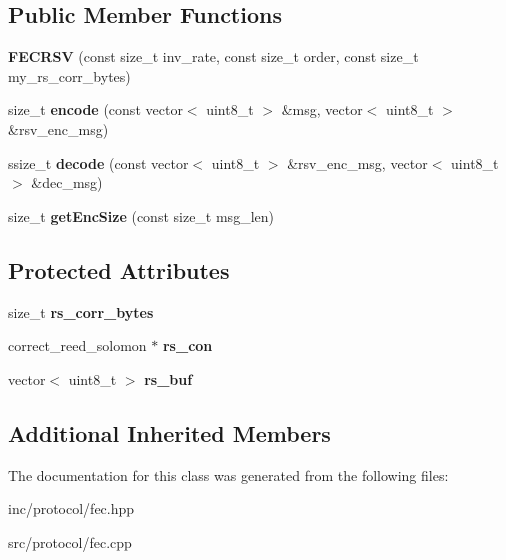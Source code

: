 \subsection*{Public Member Functions}
\begin{DoxyCompactItemize}
\item 
\mbox{\label{classFECRSV_ac7d8897c02cdb41a46d895b14bfb976f}} 
{\bfseries F\+E\+C\+R\+SV} (const size\+\_\+t inv\+\_\+rate, const size\+\_\+t order, const size\+\_\+t my\+\_\+rs\+\_\+corr\+\_\+bytes)
\item 
\mbox{\label{classFECRSV_ac9bd3fe4c494067e6f24a1287b0c562e}} 
size\+\_\+t {\bfseries encode} (const vector$<$ uint8\+\_\+t $>$ \&msg, vector$<$ uint8\+\_\+t $>$ \&rsv\+\_\+enc\+\_\+msg)
\item 
\mbox{\label{classFECRSV_a4781900bd59579d7a380687c59179ae5}} 
ssize\+\_\+t {\bfseries decode} (const vector$<$ uint8\+\_\+t $>$ \&rsv\+\_\+enc\+\_\+msg, vector$<$ uint8\+\_\+t $>$ \&dec\+\_\+msg)
\item 
\mbox{\label{classFECRSV_a62fb01c152dad2e043ae75bbacfd928c}} 
size\+\_\+t {\bfseries get\+Enc\+Size} (const size\+\_\+t msg\+\_\+len)
\end{DoxyCompactItemize}
\subsection*{Protected Attributes}
\begin{DoxyCompactItemize}
\item 
\mbox{\label{classFECRSV_abb99cf759979bc02ce129a4ba59206d3}} 
size\+\_\+t {\bfseries rs\+\_\+corr\+\_\+bytes}
\item 
\mbox{\label{classFECRSV_a6032e72eb4d7e2256009769bba63b9b7}} 
correct\+\_\+reed\+\_\+solomon $\ast$ {\bfseries rs\+\_\+con}
\item 
\mbox{\label{classFECRSV_a3bab792933973acef7689ea4dd490af5}} 
vector$<$ uint8\+\_\+t $>$ {\bfseries rs\+\_\+buf}
\end{DoxyCompactItemize}
\subsection*{Additional Inherited Members}


The documentation for this class was generated from the following files\+:\begin{DoxyCompactItemize}
\item 
inc/protocol/fec.\+hpp\item 
src/protocol/fec.\+cpp\end{DoxyCompactItemize}

